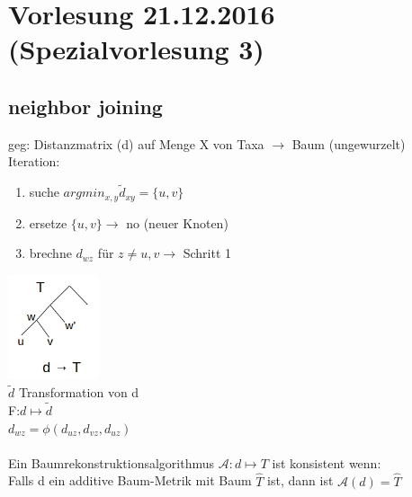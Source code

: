 \section{Vorlesung 21.12.2016 (Spezialvorlesung 3)}
\subsection{neighbor joining}
geg: Distanzmatrix (d) auf Menge X von Taxa $\rightarrow$ Baum (ungewurzelt)\\
Iteration:
\begin{enumerate}
	\item suche $argmin_{x,y} \tilde d_{xy}=\{u,v\}$
	\item ersetze $\{u,v\} \rightarrow$ no (neuer Knoten)
	\item brechne $d_{wz}$ für $z \neq u,v \rightarrow$ Schritt 1
\end{enumerate}
\includegraphics[width=0.2\textwidth]{lectures/161221/pix/1.jpg}\\
$\tilde d$ Transformation von d\\
F:$d \mapsto \tilde d$\\
$d_{wz}=\phi(d_{uz}, d_{vz}, d_{uz})$
\\\\
Ein Baumrekonstruktionsalgorithmus $\mathcal{A}:d \mapsto T$ ist konsistent wenn:\\
Falls d ein additive Baum-Metrik mit Baum $\hat T$ ist, dann ist $\mathcal{A}(d)=\hat T$

